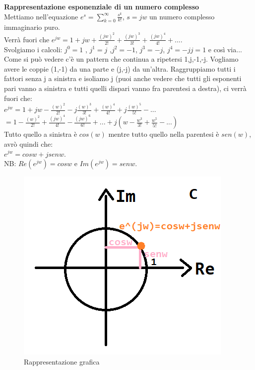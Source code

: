 \textbf{Rappresentazione esponenziale di un numero complesso}\\
Mettiamo nell'equazione $ e^s = \sum_{k=0}^\infty \frac{s^k}{k!}$, $s=jw$ un numero complesso immaginario puro.\\
Verrà fuori che $ e^{jw} = 1 + jw + \frac{(jw)^2}{2!}+ \frac{(jw)^3}{3!}+ \frac{(jw)^4}{4!}+... $.\\
Svolgiamo i calcoli: $ j^0 = 1$ , $ j^1 = j $ ,$j^2=-1 $, $ j^3=-j $, $j^4 = -jj= 1$ e così via...\\
Come si può vedere c'è un pattern che continua a ripetersi 1,j,-1,-j. Vogliamo avere le coppie (1,-1) da una parte e (j,-j) da un'altra. Raggruppiamo tutti i fattori senza j a sinistra e isoliamo j (puoi anche vedere che tutti gli esponenti pari vanno a sinistra e tutti quelli dispari vanno fra parentesi a destra), ci verrà fuori che: \\
$ e^{jw} = 1 +jw-\frac{(w)^2}{2!} -j\frac{(w)^3}{3!}+\frac{(w)^4}{4!}+j\frac{(w)^5}{5!}-... $\\
$ = 1-\frac{(w)^2}{2!}+\frac{(jw)^4}{4!}-\frac{(jw)^6}{6!}+...+j(w - \frac{w^3}{3!}+\frac{w^5}{5!}-...)$\\
Tutto quello a sinistra è $ cos(w) $ mentre tutto quello nella parentesi è $ sen(w)$, avrò quindi che:\\
$ e^{jw} = cosw +jsenw$.\\
NB: $ Re(e^{jw}) = cosw $ e $ Im(e^{jw}) = senw$.\\

\begin{figure}[h]
	\centering
	\includegraphics[scale=0.5]{immagini/rappEsp}
	\caption{ Rappresentazione grafica }
	\label{fig: rappEsp}
\end{figure}

